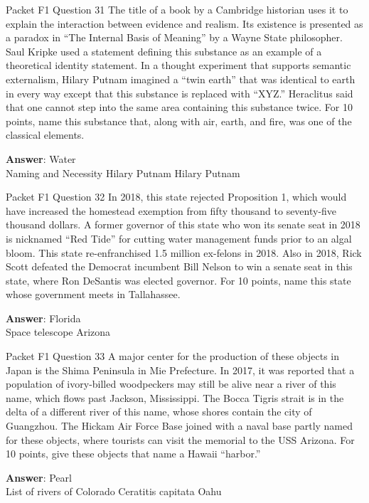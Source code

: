 \begin{frame}{Packet F1 Question 31}
The title of a book by a Cambridge historian uses it to explain the interaction between evidence and realism. Its existence is presented as a paradox in ``The Internal Basis of Meaning'' by a Wayne State philosopher. Saul Kripke used a statement defining this substance as an example   of a theoretical identity   statement. In a thought experiment that supports semantic externalism, Hilary   Putnam imagined a “twin earth” that   was identical to earth in every way except that this substance is replaced with   “XYZ.” Heraclitus said that one cannot step into the same area containing this substance twice. For 10 points, name this substance that, along with air, earth,   and fire, was one of the classical elements.

\textbf{Answer}: Water\\
 Naming and Necessity
 Hilary Putnam
 Hilary Putnam
\end{frame}

\begin{frame}{Packet F1 Question 32}
In 2018, this state rejected   Proposition 1, which would have increased the homestead exemption from fifty thousand to seventy-five thousand dollars. A former governor of this state who won its senate seat in 2018 is nicknamed “Red Tide” for cutting water management funds prior to an algal bloom. This state re-enfranchised 1.5 million ex-felons in 2018. Also in 2018, Rick Scott defeated     the Democrat   incumbent Bill Nelson to win a senate seat in this state, where Ron DeSantis was   elected governor. For 10 points, name this state whose government meets in Tallahassee.

\textbf{Answer}: Florida\\
 Space telescope
 Arizona
\end{frame}

\begin{frame}{Packet F1 Question 33}
A major center for the production of these objects in Japan is the Shima Peninsula in Mie Prefecture. In 2017, it was reported that a population of ivory-billed woodpeckers may still be alive near a river of this name, which flows past Jackson, Mississippi. The Bocca Tigris strait is in the delta of a different river of this name, whose shores   contain the city of Guangzhou. The Hickam Air Force Base joined with a naval base partly named for these objects, where tourists can visit the memorial to the USS Arizona. For   10 points, give these objects that name a Hawaii “harbor.”    

\textbf{Answer}: Pearl\\
 List of rivers of Colorado
 Ceratitis capitata
 Oahu
\end{frame}

